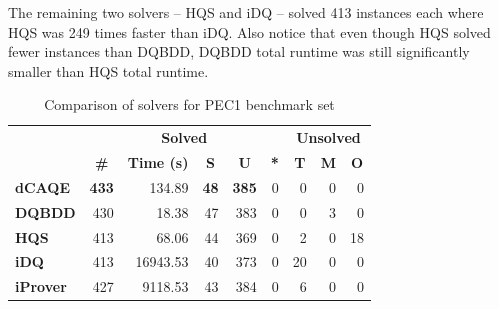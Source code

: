\documentclass[
  digital, %
  color,
  twoside, %
  table,   %
  nolof,     %
  nolot,     %
]{fithesis3}
\theoremstyle{definition}
\theoremstyle{remark}
\begin{document}
The remaining two solvers -- HQS and iDQ -- solved 413 instances each where HQS was 249 times faster than iDQ. Also notice that even though HQS solved fewer instances than DQBDD, DQBDD total runtime was still significantly smaller than HQS total runtime.

\begin{table}[ht]
\centering
\caption{Comparison of solvers for PEC1 benchmark set}%
\label{tab:PEC1}
\begin{tabular}{|l|r|r|r|r|r|r|r|r|}
\hline
\multicolumn{1}{|c|}{}                                  & \multicolumn{5}{c|}{\textbf{Solved}}                                                                                                                                        & \multicolumn{3}{c|}{\textbf{Unsolved}}                                                                 \\  \hhline{~*{8}{-}}
\multicolumn{1}{|c|}{\multirow{-2}{*}{\textbf{Solver}}} & \multicolumn{1}{c|}{\textbf{\#}} & \multicolumn{1}{c|}{\textbf{Time (s)}} & \multicolumn{1}{c|}{\textbf{S}} & \multicolumn{1}{c|}{\textbf{U}} & \multicolumn{1}{c|}{\textbf{*}} & \multicolumn{1}{c|}{\textbf{T}} & \multicolumn{1}{c|}{\textbf{M}} & \multicolumn{1}{c|}{\textbf{O}} \\ \hline
\textbf{dCAQE} & \textbf{433} & \num{134.89} & \phantom{0}\textbf{48} & \textbf{385} & \phantom{00}\num{0} & \phantom{00}\num{0} & \phantom{00}\num{0} & \phantom{00}\num{0} \\ \hline
\textbf{DQBDD} & \num{430} & \num{18.38} & \num{47} & \num{383} & \num{0} & \num{0} & \num{3} & \num{0} \\ \hline
\textbf{HQS} & \num{413} & \num{68.06} & \num{44} & \num{369} & \num{0} & \num{2} & \num{0} & \num{18} \\ \hline
\textbf{iDQ} & \num{413} & \num{16943.53} & \num{40} & \num{373} & \num{0} & \num{20} & \num{0} & \num{0} \\ \hline
\textbf{iProver} & \num{427} & \num{9118.53} & \num{43} & \num{384} & \num{0} & \num{6} & \num{0} & \num{0} \\ \hline
\end{tabular}
\end{table}
\end{document}
